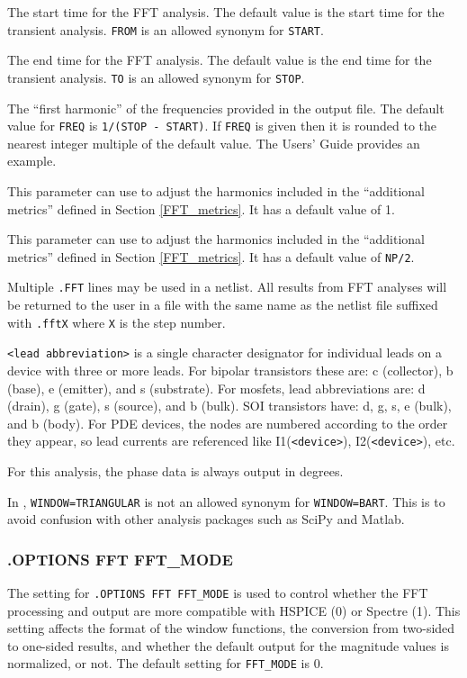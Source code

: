 \begin{Command}
\begin {Arguments}
The start time for the FFT analysis.  The default value is the
start time for the transient analysis. {\tt FROM} is an allowed
synonym for {\tt START}.

The end time for the FFT analysis.  The default value is the
end time for the transient analysis. {\tt TO} is an allowed
synonym for {\tt STOP}.

The ``first harmonic'' of the frequencies provided in the output
file.  The default value for {\tt FREQ} is {\tt 1/(STOP - START)}.
If {\tt FREQ} is given then it is rounded to the nearest integer
multiple of the default value.  The \Xyce{} Users' Guide\UsersGuide
provides an example.

This parameter can use to adjust the harmonics included in the
``additional metrics'' defined in Section \ref{FFT_metrics}.  It
has a default value of 1.

This parameter can use to adjust the harmonics included in the
``additional metrics'' defined in Section \ref{FFT_metrics}.  It
has a default value of \texttt{NP/2}.

\end{Arguments}

\comments
Multiple \texttt{.FFT} lines may be used in a netlist.  All results from FFT analyses
will be returned to the user in a file with the same name as the netlist file suffixed
with \texttt{.fftX} where {\tt X} is the step number.

\texttt{<lead abbreviation>} is a single character designator for individual
leads on a device with three or more leads.  For bipolar transistors these are:
c (collector), b (base), e (emitter), and s (substrate).  For mosfets, lead
abbreviations are: d (drain), g (gate), s (source), and b (bulk).  SOI
transistors have: d, g, s, e (bulk), and b (body).  For PDE devices, the nodes
are numbered according to the order they appear, so lead currents are
referenced like I1(\texttt{<device>}), I2(\texttt{<device>}), etc.

For this analysis, the phase data is always output in degrees.

In \Xyce{}, \texttt{WINDOW=TRIANGULAR} is not an allowed synonym for
\texttt{WINDOW=BART}.  This is to avoid confusion with other analysis
packages such as SciPy and Matlab.

\end{Command}

\subsubsection{.OPTIONS FFT FFT\_MODE}
\label{FFT_MODE}
The setting for \texttt{.OPTIONS FFT FFT\_MODE} is used to control whether the
\Xyce{} FFT processing and output are more compatible with HSPICE (0) or
Spectre (1).  This setting affects the format of the window functions, the
conversion from two-sided to one-sided results, and whether the default output
for the magnitude values is normalized, or not.  The default setting for
\texttt{FFT\_MODE} is 0.

